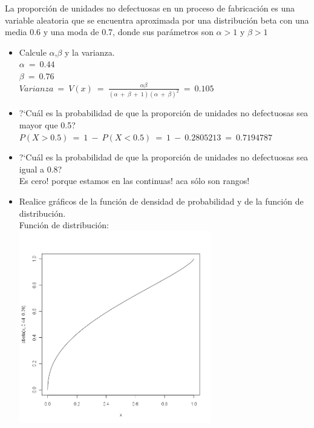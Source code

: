 %
%

La proporci\'on de unidades no defectuosas en un proceso de fabricaci\'on es una variable aleatoria que se encuentra aproximada por
una distribuci\'on beta con una media 0.6 y una moda de 0.7, donde sus par\'ametros son $ \alpha > 1$ y $\beta > 1$
\begin{itemize}
	\item Calcule $\alpha$,$\beta$  y la varianza.\\
		$\alpha\ =\ 0.44$\\
		$\beta\ =\ 0.76$\\
		$Varianza\ =\ V(x)\ =\ \frac{\alpha \beta}{(\alpha\ +\ \beta\ +\ 1)(\alpha\ +\ \beta)^2}\ =\ 0.105$\\
	\item ?`Cu\'al es la probabilidad de que la proporci\'on de unidades no defectuosas sea mayor que 0.5?\\
		$P(X>0.5)\ =\ 1\ -\ P(X<0.5)\ =\ 1\ -\ 0.2805213\ =\ 0.7194787$\\
	\item ?`Cu\'al es la probabilidad de que la proporci\'on de unidades no defectuosas sea igual a 0.8?\\
		Es cero! porque estamos en las continuas! aca s\'olo son rangos!\\
	\item Realice gr\'aficos de la funci\'on de densidad de probabilidad y de la funci\'on de distribuci\'on.\\
	Funci\'on de distribuci\'on:\\
  	  \includegraphics[width=3.3in,height=3.3in]{images/2_4-pbeta.png}\\

\end{itemize}
